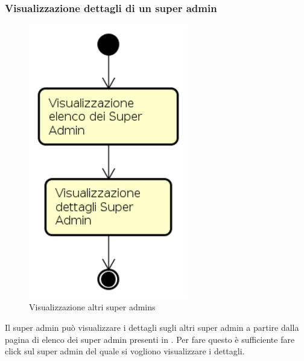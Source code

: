 \subsubsection{Visualizzazione dettagli di un super admin}
\begin{figure}[H]
\begin{center}
\includegraphics[height=12cm]{res/sections/backend/activities/visualizzazioneDettagliSuperAdminSA.png}
\caption{Visualizzazione altri super admins}
\end{center}
\end{figure}
Il super admin può visualizzare i dettagli sugli altri super admin a partire dalla pagina di elenco dei super admin presenti in . Per fare questo è sufficiente fare click sul super admin del quale si vogliono visualizzare i dettagli.